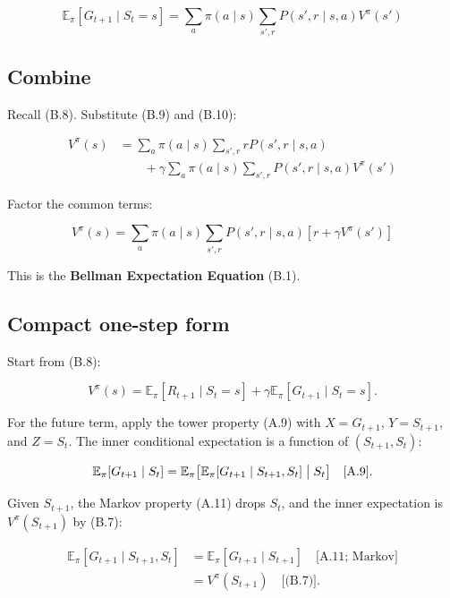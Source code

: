 \begin{equation}
\boxed{
\mathbb{E}_\pi[G_{t+1}\mid S_t=s]
=
\sum_a
\pi(a\mid s)
\sum_{s',r}
P(s',r\mid s,a)V^\pi(s')
}
\tag{B.10}
\end{equation}

\subsection{Combine}

Recall (B.8). Substitute (B.9) and (B.10):

\[
\begin{aligned}
V^\pi(s)
&=
\sum_a\pi(a\mid s)
\sum_{s',r}
rP(s',r\mid s,a)
\\
&\qquad+
\gamma
\sum_a\pi(a\mid s)
\sum_{s',r}
P(s',r\mid s,a)V^\pi(s')
\end{aligned}
\]

Factor the common terms:

\begin{equation}
\boxed{
V^\pi(s)
=
\sum_a
\pi(a\mid s)
\sum_{s',r}
P(s',r\mid s,a)
\left[
r+\gamma V^\pi(s')
\right]
}
\tag{B.1}
\end{equation}

This is the \textbf{Bellman Expectation Equation} (B.1).

\subsection{Compact one-step form}

Start from (B.8):

\[
V^\pi(s)
=
\mathbb{E}_\pi[R_{t+1}\mid S_t=s]
+
\gamma
\mathbb{E}_\pi[G_{t+1}\mid S_t=s].
\]

For the future term, apply the tower property (A.9) with $X=G_{t+1}$, $Y=S_{t+1}$, and $Z=S_t$. The inner conditional expectation is a function of $(S_{t+1},S_t)$:

\[
\mathbb{E}_\pi[G_{t+1}\mid S_t]
=
\mathbb{E}_\pi\bigl[
\mathbb{E}_\pi[G_{t+1}\mid S_{t+1},S_t]
\bigm|
S_t
\bigr]
\quad\text{[A.9]}.
\]

Given $S_{t+1}$, the Markov property (A.11) drops $S_t$, and the inner expectation is $V^\pi(S_{t+1})$ by (B.7):

\[
\begin{aligned}
\mathbb{E}_\pi[G_{t+1}\mid S_{t+1},S_t]
&=
\mathbb{E}_\pi[G_{t+1}\mid S_{t+1}]
\quad\text{[A.11; Markov]}
\\
&=
V^\pi(S_{t+1})
\quad\text{[(B.7)]}.
\end{aligned}
\]

